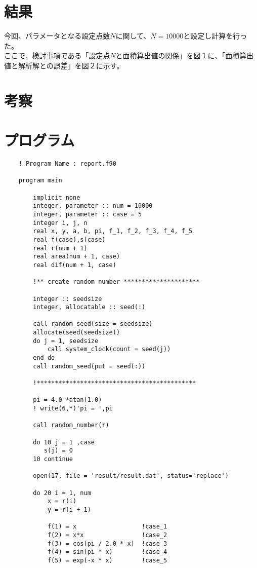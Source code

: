 \documentclass[12pt,a4paper]{jsarticle}
\begin{document}
\section{結果}
今回、パラメータとなる設定点数$N$に関して、$N=10000$と設定し計算を行った。\\
ここで、検討事項である「設定点$N$と面積算出値の関係」を図１に、「面積算出値と解析解との誤差」を図２に示す。

\section{考察}

\newpage
\section{プログラム}
\small
\begin{lstlisting}
    ! Program Name : report.f90

    program main
    
        implicit none
        integer, parameter :: num = 10000
        integer, parameter :: case = 5
        integer i, j, n
        real x, y, a, b, pi, f_1, f_2, f_3, f_4, f_5
        real f(case),s(case)
        real r(num + 1)
        real area(num + 1, case)
        real dif(num + 1, case)
    
        !** create random number *********************
        
        integer :: seedsize
        integer, allocatable :: seed(:)
        
        call random_seed(size = seedsize)       
        allocate(seed(seedsize))               
        do j = 1, seedsize
            call system_clock(count = seed(j)) 
        end do
        call random_seed(put = seed(:))         
        
        !********************************************
    
        pi = 4.0 *atan(1.0)
        ! write(6,*)'pi = ',pi
    
        call random_number(r)
    
        do 10 j = 1 ,case
           s(j) = 0
        10 continue
    
        open(17, file = 'result/result.dat', status='replace')
    
        do 20 i = 1, num
            x = r(i)
            y = r(i + 1)
        
            f(1) = x                  !case_1
            f(2) = x*x                !case_2
            f(3) = cos(pi / 2.0 * x)  !case_3
            f(4) = sin(pi * x)        !case_4
            f(5) = exp(-x * x)        !case_5
    

\end{lstlisting}
\end{document}
